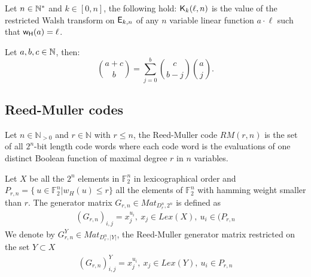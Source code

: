 \documentclass[11pt]{llncs}
\begin{document}
\begin{Prop}\label{prop:Kr}
	Let $n\in \mathbb{N}^*$ and $k\in [0,n]$, the following hold:
 $\mathsf{K}_{k}(\ell,n)$ is the value of the restricted Walsh transform on $\mathsf{E}_{k,n}$ of any $n$ variable linear function $a\cdot \ell$ such that $\mathsf{w_H}(a)=\ell$.
\end{Prop}


\begin{Prop}\label{prop:Vandermonde}
	Let $a,b,c \in \mathbb{N}$, then:
	\begin{equation*}
	\binom{a+c}{b}=\sum_{j=0}^b\binom{c}{b-j}  \binom{a}{j}.
	\end{equation*}
\end{Prop}




\subsection{Reed-Muller codes}

\begin{definition}
	Let $n\in \mathbb{N}_{>0}$ and $r\in \mathbb{N}$ with $r\leq n$, the Reed-Muller code $RM(r,n)$ is the set of all $2^n$-bit length code words where each code word is the evaluations of one distinct Boolean function of maximal degree $r$ in $n$ variables.
\end{definition}

\begin{definition}\label{rmGenerator}
	Let $X$ be all the $2^n$ elements in $\mathbb{F}_2^n$ in lexicographical order and $P_{r,n} = \{\ u\in \mathbb{F}_2^n | w_H(u) \leq r\}$ all the elements of $\mathbb{F}_2^n$ with hamming weight smaller than $r$. The generator matrix $G_{r,n}\in Mat_{D_r^n,2^n}$ is defined as
	\begin{align*}
	\left(G_{r,n}\right)_{i,j} = x_j^{u_i}, \ x_j \in Lex\left(X\right),\ u_i \in (P_{r,n}
	\end{align*}
	We denote by $G_{r,n}^Y\in Mat_{D_r^n,|Y|}$, the Reed-Muller generator matrix restricted on the set $Y \subset X$
	\begin{align*}
	\left(G_{r,n}\right)^Y_{i,j} = x_j^{u_i}, \ x_j \in Lex(Y),\ u_i \in P_{r,n}
	\end{align*}
\end{definition}
\end{document}
